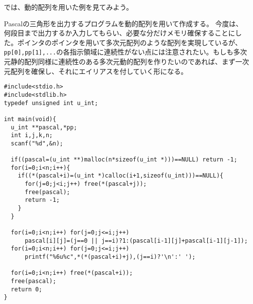 では、動的配列を用いた例を見てみよう。
\begin{boxnote}
Pascalの三角形を出力するプログラムを動的配列を用いて作成する。
今度は、何段目まで出力するか入力してもらい、必要な分だけメモリ確保することにした。ポインタのポインタを用いて多次元配列のような配列を実現しているが、\verb|pp[0],pp[1],...|の各指示領域に連続性がない点には注意されたい。もしも多次元静的配列同様に連続性のある多次元動的配列を作りたいのであれば、まず一次元配列を確保し、それにエイリアスを付していく形になる。
\end{boxnote}
\begin{boxnote}
\begin{lstlisting}[caption=Pascalの三角形(動的配列版),label=program11_6]
#include<stdio.h>
#include<stdlib.h>
typedef unsigned int u_int;

int main(void){
  u_int **pascal,*pp;
  int i,j,k,n;
  scanf("%d",&n);
  
  if((pascal=(u_int **)malloc(n*sizeof(u_int *)))==NULL) return -1;
  for(i=0;i<n;i++){
    if((*(pascal+i)=(u_int *)calloc(i+1,sizeof(u_int)))==NULL){
      for(j=0;j<i;j++) free(*(pascal+j));
      free(pascal);
      return -1;
    }
  }
  
  for(i=0;i<n;i++) for(j=0;j<=i;j++)
      pascal[i][j]=(j==0 || j==i)?1:(pascal[i-1][j]+pascal[i-1][j-1]);
  for(i=0;i<n;i++) for(j=0;j<=i;j++)
      printf("%6u%c",*(*(pascal+i)+j),(j==i)?'\n':' ');

  for(i=0;i<n;i++) free(*(pascal+i));
  free(pascal);
  return 0;
}
\end{lstlisting}
\end{boxnote}

